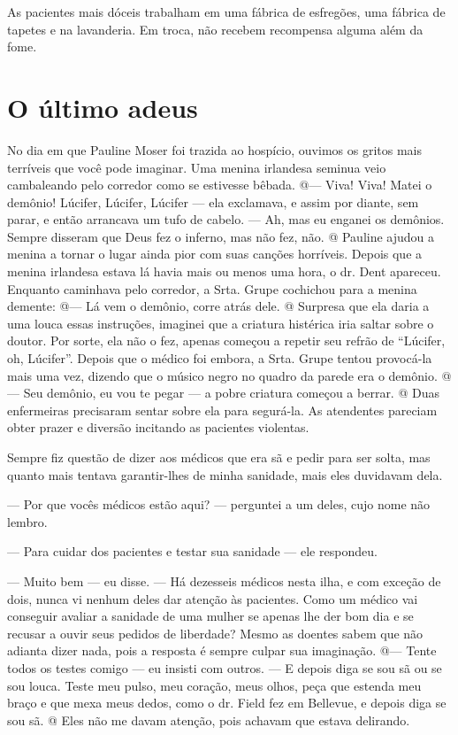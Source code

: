 As pacientes mais dóceis trabalham em uma fábrica de esfregões, uma
fábrica de tapetes e na lavanderia. Em troca, não recebem recompensa
alguma além da fome.

\label{section-10}

\chapter{O último
adeus}\label{capuxedtulo-xvi-o-uxfaltimo-adeus}

No dia em que Pauline Moser foi trazida ao hospício, ouvimos os gritos
mais terríveis que você pode imaginar. Uma menina irlandesa seminua veio
cambaleando pelo corredor como se estivesse bêbada. @--- Viva! Viva!
Matei o demônio! Lúcifer, Lúcifer, Lúcifer --- ela exclamava, e assim
por diante, sem parar, e então arrancava um tufo de cabelo. --- Ah, mas
eu enganei os demônios. Sempre disseram que Deus fez o inferno, mas não
fez, não. @ Pauline ajudou a menina a tornar o lugar ainda pior com suas
canções horríveis. Depois que a menina irlandesa estava lá havia mais ou
menos uma hora, o dr. Dent apareceu. Enquanto caminhava pelo corredor, a
Srta. Grupe cochichou para a menina demente: @--- Lá vem o demônio,
corre atrás dele. @ Surpresa que ela daria a uma louca essas instruções,
imaginei que a criatura histérica iria saltar sobre o doutor. Por sorte,
ela não o fez, apenas começou a repetir seu refrão de ``Lúcifer, oh,
Lúcifer''. Depois que o médico foi embora, a Srta. Grupe tentou
provocá-la mais uma vez, dizendo que o músico negro no quadro da parede
era o demônio. @--- Seu demônio, eu vou te pegar --- a pobre criatura
começou a berrar. @ Duas enfermeiras precisaram sentar sobre ela para
segurá-la. As atendentes pareciam obter prazer e diversão incitando as
pacientes violentas.

Sempre fiz questão de dizer aos médicos que era sã e pedir para ser
solta, mas quanto mais tentava garantir-lhes de minha sanidade, mais
eles duvidavam dela.

--- Por que vocês médicos estão aqui? --- perguntei a um deles, cujo
nome não lembro.

--- Para cuidar dos pacientes e testar sua sanidade --- ele respondeu.

--- Muito bem --- eu disse. --- Há dezesseis médicos nesta ilha, e com
exceção de dois, nunca vi nenhum deles dar atenção às pacientes. Como um
médico vai conseguir avaliar a sanidade de uma mulher se apenas lhe der
bom dia e se recusar a ouvir seus pedidos de liberdade? Mesmo as doentes
sabem que não adianta dizer nada, pois a resposta é sempre culpar sua
imaginação. @--- Tente todos os testes comigo --- eu insisti com outros.
--- E depois diga se sou sã ou se sou louca. Teste meu pulso, meu
coração, meus olhos, peça que estenda meu braço e que mexa meus dedos,
como o dr. Field fez em Bellevue, e depois diga se sou sã. @ Eles não me
davam atenção, pois achavam que estava delirando.

